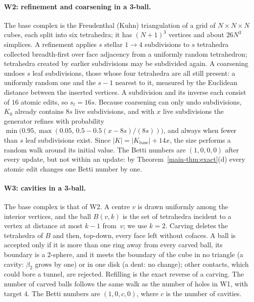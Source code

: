 \paragraph{W2: refinement and coarsening in a 3-ball.}
The base complex is the Freudenthal (Kuhn) triangulation of a grid of
$N\times N\times N$ cubes, each split into six tetrahedra; it has $(N+1)^3$
vertices and about $26N^3$ simplices. A refinement applies $s$ stellar $1\to4$
subdivisions to $s$ tetrahedra collected breadth-first over face adjacency from
a uniformly random tetrahedron; tetrahedra created by earlier subdivisions may
be subdivided again. A coarsening undoes $s$ leaf subdivisions, those whose four
tetrahedra are all still present: a uniformly random one and the $s-1$ nearest
to it, measured by the Euclidean distance between the inserted vertices. A
subdivision and its inverse each consist of $16$ atomic edits, so $s_t=16s$.
Because coarsening can only undo subdivisions, $K_0$ already contains $8s$ live
subdivisions, and with $x$ live subdivisions the generator refines with
probability $\min\bigl(0.95,\max(0.05,\,0.5-0.5(x-8s)/(8s))\bigr)$, and always
when fewer than $s$ leaf subdivisions exist. Since $|K|=|K_{\mathrm{base}}|+14x$,
the size performs a random walk around its initial value. The Betti
numbers are $(1,0,0,0)$ after every update, but not within an update: by
Theorem~\ref{main-thm:exact}(d) every atomic edit changes one Betti number by one.

\paragraph{W3: cavities in a 3-ball.}
The base complex is that of W2. A centre $v$ is drawn uniformly among the
interior vertices, and the ball $B(v,k)$ is the set of tetrahedra incident to a
vertex at distance at most $k-1$ from~$v$; we use $k=2$. Carving deletes the
tetrahedra of $B$ and then, top-down, every face left without cofaces. A ball is
accepted only if it is more than one ring away from every carved ball, its
boundary is a $2$-sphere, and it meets the boundary of the cube in no triangle (a
cavity: $\beta_2$ grows by one) or in one disk (a dent: no change); other
contacts, which could bore a tunnel, are rejected. Refilling is the exact
reverse of a carving. The number of carved balls follows the same walk as the
number of holes in W1, with target $4$. The Betti numbers are $(1,0,c,0)$, where
$c$ is the number of cavities.

